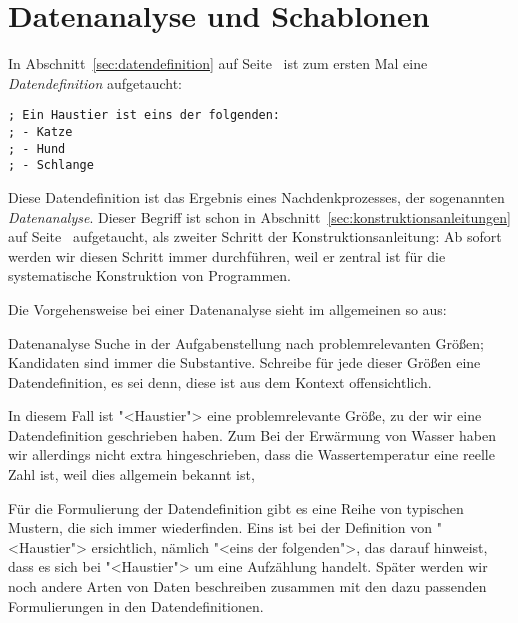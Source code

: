 \section{Datenanalyse und Schablonen}
\label{sec:datenanalyse}

In Abschnitt~\ref{sec:datendefinition} auf
Seite~\pageref{sec:datendefinition} ist zum ersten Mal eine
\textit{Datendefinition} aufgetaucht:
%
\begin{verbatim}
; Ein Haustier ist eins der folgenden:
; - Katze
; - Hund
; - Schlange
\end{verbatim}
%
Diese Datendefinition ist das Ergebnis eines Nachdenkprozesses, der
sogenannten \textit{Datenanalyse}.  Dieser Begriff
ist schon in Abschnitt~\ref{sec:konstruktionsanleitungen} auf
Seite~\pageref{sec:konstruktionsanleitungen} aufgetaucht, als zweiter
Schritt der Konstruktionsanleitung: Ab sofort werden wir diesen
Schritt immer durchführen, weil er zentral ist für die systematische
Konstruktion von Programmen.

Die Vorgehensweise bei einer Datenanalyse sieht im allgemeinen so aus:
%
\begin{konstruktionsanleitung}{Datenanalyse}
  Suche in der Aufgabenstellung nach problemrelevanten Größen;
  Kandidaten sind immer die Substantive. Schreibe für jede dieser
  Größen eine Datendefinition, es sei denn, diese ist aus dem Kontext
  offensichtlich.
\end{konstruktionsanleitung}
%
In diesem Fall ist "<Haustier"> eine problemrelevante Größe, zu der
wir eine Datendefinition geschrieben haben.  Zum Bei der Erwärmung von
Wasser haben wir allerdings nicht extra hingeschrieben, dass die
Wassertemperatur eine reelle Zahl ist, weil dies allgemein bekannt
ist,

Für die Formulierung der Datendefinition gibt es eine Reihe von
typischen Mustern, die sich immer wiederfinden.  Eins ist bei der
Definition von "<Haustier"> ersichtlich, nämlich "<eins der
folgenden">, das darauf hinweist, dass es sich bei "<Haustier"> um
eine Aufzählung handelt.  Später werden wir noch andere Arten
von Daten beschreiben zusammen mit den dazu passenden Formulierungen
in den Datendefinitionen.

